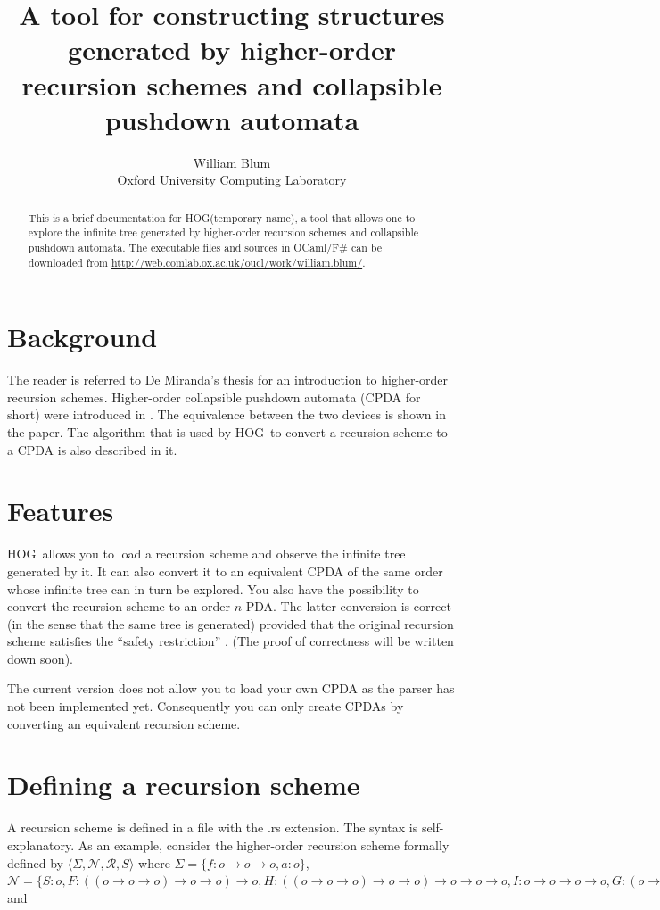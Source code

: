 \documentclass{article}
\author{William Blum\\ Oxford University Computing Laboratory}
\title{A tool for constructing structures generated by higher-order recursion schemes and collapsible pushdown automata}
\def\toolname{HOG}
\begin{document}
\maketitle
\begin{abstract}
This is a brief documentation for \toolname (temporary name), a tool that allows one to explore the
infinite tree generated by higher-order recursion schemes and collapsible pushdown automata.
 The executable files and sources in OCaml/F\# can be downloaded from \url{http://web.comlab.ox.ac.uk/oucl/work/william.blum/}.

\end{abstract}

\section{Background}
The reader is referred to De Miranda's thesis \cite{demirandathesis} for an introduction to higher-order recursion schemes. Higher-order collapsible pushdown automata (CPDA for short) were introduced in \cite{hague-sto07}. The equivalence between the two devices is shown in the paper.
The algorithm that is used by \toolname\ to convert a recursion scheme to a CPDA is also described in
it.

\section{Features}

\toolname\ allows you to load a recursion scheme and observe the infinite tree generated by it.
It can also convert it to an equivalent CPDA of the same order whose infinite tree can in turn be explored. You also have the possibility to convert the recursion scheme to an order-$n$ PDA. The latter conversion is correct (in the sense that the same tree is generated) provided that the original recursion scheme satisfies the ``safety restriction'' \cite{KNU02}. (The proof of correctness will be written down soon).

The current version does not allow you to load your own CPDA as the parser has not been implemented yet. Consequently you can only create CPDAs by converting an equivalent recursion scheme.


\section{Defining a recursion scheme}
\label{sec:defrecscheme}
A recursion scheme is defined in a file with the .rs extension. 
The syntax is self-explanatory. As an example, consider the higher-order recursion scheme formally defined by
$\langle \Sigma, \mathcal{N}, \mathcal{R}, S \rangle $
where $\Sigma = \{f:o\rightarrow o\rightarrow o, a:o \}$, $\mathcal{N} = \{
S: o, F: ((o \rightarrow o \rightarrow o)\rightarrow o\rightarrow o) \rightarrow o, H: ((o \rightarrow o \rightarrow o)\rightarrow o\rightarrow o) \rightarrow o \rightarrow o \rightarrow o, I: o \rightarrow o \rightarrow o \rightarrow o,
    G: (o \rightarrow o \rightarrow o)\rightarrow o\rightarrow o \}$ and 
    
\end{document}
